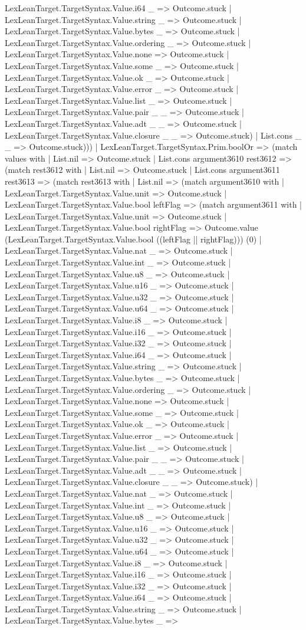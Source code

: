 \documentclass[11pt]{article}
\begin{document}
LexLeanTarget.TargetSyntax.Value.i64 \_ => Outcome.stuck | LexLeanTarget.TargetSyntax.Value.string \_ => Outcome.stuck | LexLeanTarget.TargetSyntax.Value.bytes \_ => Outcome.stuck | LexLeanTarget.TargetSyntax.Value.ordering \_ => Outcome.stuck | LexLeanTarget.TargetSyntax.Value.none => Outcome.stuck | LexLeanTarget.TargetSyntax.Value.some \_ => Outcome.stuck | LexLeanTarget.TargetSyntax.Value.ok \_ => Outcome.stuck | LexLeanTarget.TargetSyntax.Value.error \_ => Outcome.stuck | LexLeanTarget.TargetSyntax.Value.list \_ => Outcome.stuck | LexLeanTarget.TargetSyntax.Value.pair \_ \_ => Outcome.stuck | LexLeanTarget.TargetSyntax.Value.adt \_ \_ => Outcome.stuck | LexLeanTarget.TargetSyntax.Value.closure \_ \_ => Outcome.stuck) | List.cons \_ \_ => Outcome.stuck))) | LexLeanTarget.TargetSyntax.Prim.boolOr => (match values with | List.nil => Outcome.stuck | List.cons argument3610 rest3612 => (match rest3612 with | List.nil => Outcome.stuck | List.cons argument3611 rest3613 => (match rest3613 with | List.nil => (match argument3610 with | LexLeanTarget.TargetSyntax.Value.unit => Outcome.stuck | LexLeanTarget.TargetSyntax.Value.bool leftFlag => (match argument3611 with | LexLeanTarget.TargetSyntax.Value.unit => Outcome.stuck | LexLeanTarget.TargetSyntax.Value.bool rightFlag => Outcome.value (LexLeanTarget.TargetSyntax.Value.bool ((leftFlag || rightFlag))) (0) | LexLeanTarget.TargetSyntax.Value.nat \_ => Outcome.stuck | LexLeanTarget.TargetSyntax.Value.int \_ => Outcome.stuck | LexLeanTarget.TargetSyntax.Value.u8 \_ => Outcome.stuck | LexLeanTarget.TargetSyntax.Value.u16 \_ => Outcome.stuck | LexLeanTarget.TargetSyntax.Value.u32 \_ => Outcome.stuck | LexLeanTarget.TargetSyntax.Value.u64 \_ => Outcome.stuck | LexLeanTarget.TargetSyntax.Value.i8 \_ => Outcome.stuck | LexLeanTarget.TargetSyntax.Value.i16 \_ => Outcome.stuck | LexLeanTarget.TargetSyntax.Value.i32 \_ => Outcome.stuck | LexLeanTarget.TargetSyntax.Value.i64 \_ => Outcome.stuck | LexLeanTarget.TargetSyntax.Value.string \_ => Outcome.stuck | LexLeanTarget.TargetSyntax.Value.bytes \_ => Outcome.stuck | LexLeanTarget.TargetSyntax.Value.ordering \_ => Outcome.stuck | LexLeanTarget.TargetSyntax.Value.none => Outcome.stuck | LexLeanTarget.TargetSyntax.Value.some \_ => Outcome.stuck | LexLeanTarget.TargetSyntax.Value.ok \_ => Outcome.stuck | LexLeanTarget.TargetSyntax.Value.error \_ => Outcome.stuck | LexLeanTarget.TargetSyntax.Value.list \_ => Outcome.stuck | LexLeanTarget.TargetSyntax.Value.pair \_ \_ => Outcome.stuck | LexLeanTarget.TargetSyntax.Value.adt \_ \_ => Outcome.stuck | LexLeanTarget.TargetSyntax.Value.closure \_ \_ => Outcome.stuck) | LexLeanTarget.TargetSyntax.Value.nat \_ => Outcome.stuck | LexLeanTarget.TargetSyntax.Value.int \_ => Outcome.stuck | LexLeanTarget.TargetSyntax.Value.u8 \_ => Outcome.stuck | LexLeanTarget.TargetSyntax.Value.u16 \_ => Outcome.stuck | LexLeanTarget.TargetSyntax.Value.u32 \_ => Outcome.stuck | LexLeanTarget.TargetSyntax.Value.u64 \_ => Outcome.stuck | LexLeanTarget.TargetSyntax.Value.i8 \_ => Outcome.stuck | LexLeanTarget.TargetSyntax.Value.i16 \_ => Outcome.stuck | LexLeanTarget.TargetSyntax.Value.i32 \_ => Outcome.stuck | LexLeanTarget.TargetSyntax.Value.i64 \_ => Outcome.stuck | LexLeanTarget.TargetSyntax.Value.string \_ => Outcome.stuck | LexLeanTarget.TargetSyntax.Value.bytes \_ => 
\end{document}

